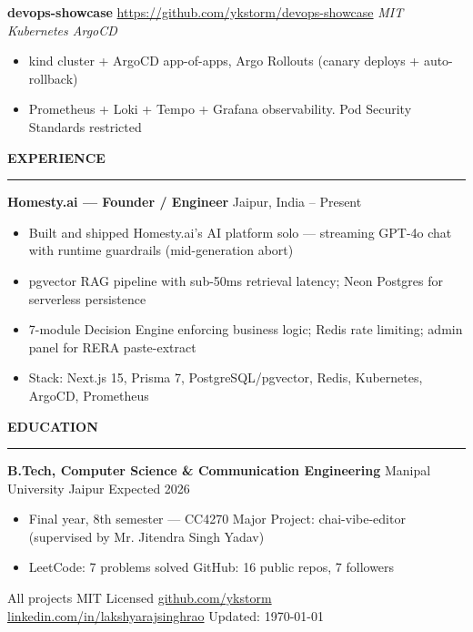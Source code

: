 \documentclass[11pt, a4paper]{article}
\def\resumeSection#1{
  \parbox[t]{\linewidth}{\color{primary}\large\bfseries\uppercase{#1}}
  \nopagebreak\vspace{-2pt}
  {\color{border}\rule{\linewidth}{0.5pt}}
  \vspace{6pt}
}
\begin{document}
\textbf{devops-showcase} \quad
\small\url{https://github.com/ykstorm/devops-showcase} \quad
\textit{MIT \cdot Kubernetes \cdot ArgoCD}
\vspace{1pt}
\begin{itemize}
\item kind cluster + ArgoCD app-of-apps, Argo Rollouts (canary deploys + auto-rollback)
\item Prometheus + Loki + Tempo + Grafana observability. Pod Security Standards restricted
\end{itemize}
\vspace{6pt}

\resumeSection{Experience}

\textbf{Homesty.ai --- Founder / Engineer} \quad Jaipur, India  -- Present
\vspace{1pt}
\begin{itemize}
\item Built and shipped Homesty.ai's AI platform solo --- streaming GPT-4o chat with runtime guardrails (mid-generation abort)
\item pgvector RAG pipeline with sub-50ms retrieval latency; Neon Postgres for serverless persistence
\item 7-module Decision Engine enforcing business logic; Redis rate limiting; admin panel for RERA paste-extract
\item Stack: Next.js 15, Prisma 7, PostgreSQL/pgvector, Redis, Kubernetes, ArgoCD, Prometheus
\end{itemize}
\vspace{6pt}

\resumeSection{Education}

\textbf{B.Tech, Computer Science \& Communication Engineering} \quad Manipal University Jaipur \quad Expected 2026
\vspace{1pt}
\begin{itemize}
\item Final year, 8th semester --- CC4270 Major Project: chai-vibe-editor (supervised by Mr. Jitendra Singh Yadav)
\item LeetCode: 7 problems solved \quad GitHub: 16 public repos, 7 followers
\end{itemize}
\vspace{6pt}

\noindent{\color{border}\rule{\linewidth}{0.3pt}}
\vspace{3pt}
{\small\color{lighttext}
  All projects MIT Licensed \quad
  \href{https://github.com/ykstorm}{github.com/ykstorm} \quad
  \href{https://linkedin.com/in/lakshyarajsinghrao}{linkedin.com/in/lakshyarajsinghrao} \quad
  Updated: \today
}
\end{document}
